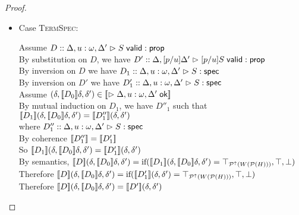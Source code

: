 \begin{proof}
\begin{enumerate}
\begin{itemize}
  \item Case \textsc{TermSpec}: 
    \begin{tabbedproof}
      \oo Assume $D :: \judgeA[{\Delta, u:\omega, \Delta'}]{\validprop{S}}{\assert}$ \\
      \oo By substitution on $D$, we have 
          $D' :: \judgeA[{\Delta, [p/u]\Delta'}]{[p/u]\validprop{S}}{\assert}$ \\
      \oo By inversion on $D$ we have 
          $D_1 :: \judgeS[{\Delta, u:\omega, \Delta'}]{S}$ \\
      \oo By inversion on $D'$ we have 
          $D'_1 :: \judgeS[{\Delta, u:\omega, \Delta'}]{S}$ \\
      \oo Assume $(\delta, \interp{D_0}\delta, \delta') \in 
                     \interp{\judgeACtx{\Delta, u:\omega, \Delta'}}$ \\
      \ooo By mutual induction on $D_1$, we have $D''_1$ such that \\
      \ooox $\interp{D_1}(\delta, \interp{D_0}\delta, \delta') = 
            \interp{D''_1}(\delta, \delta')$\\
      \ooo where $D''_1 :: \judgeS[{\Delta, u:\omega, \Delta'}]{S}$ \\
      \ooo By coherence $\interp{D''_1} = \interp{D'_1}$ \\
      \ooo So $\interp{D_1}(\delta, \interp{D_0}\delta, \delta') = 
               \interp{D'_1}(\delta, \delta')$ \\
      \ooo By semantics, $\interp{D}(\delta, \interp{D_0}\delta, \delta') = 
            \mbox{if}(\interp{D_1}(\delta, \interp{D_0}\delta, \delta') = \top_{\upset{W(\powerset{H})}}, \top, \bot)$ \\
      \ooo Therefore $\interp{D}(\delta, \interp{D_0}\delta, \delta') = 
            \mbox{if}(\interp{D'_1}(\delta, \delta') = \top_{\upset{W(\powerset{H})}}, \top, \bot)$ \\
      \ooo Therefore $\interp{D}(\delta, \interp{D_0}\delta, \delta') = \interp{D'}(\delta, \delta')$ \\
    \end{tabbedproof}


\end{itemize}
\end{enumerate}
\end{proof}
